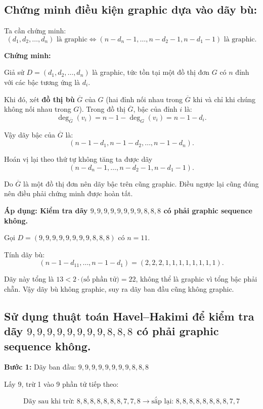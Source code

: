 \documentclass{article}
\begin{document}
	\subsection*{Chứng minh điều kiện graphic dựa vào dãy bù:}
	
	Ta cần chứng minh:
	\[
	(d_1, d_2, \ldots, d_n) \text{ là graphic} \iff (n - d_n - 1, \ldots, n - d_2 - 1, n - d_1 - 1) \text{ là graphic}.
	\]
	
	\textbf{Chứng minh:}
	
	Giả sử $D = (d_1, d_2, \ldots, d_n)$ là graphic, tức tồn tại một đồ thị đơn $G$ có $n$ đỉnh với các bậc tương ứng là $d_i$.
	
	Khi đó, xét \textbf{đồ thị bù} $\overline{G}$ của $G$ (hai đỉnh nối nhau trong $\overline{G}$ khi và chỉ khi chúng không nối nhau trong $G$). Trong đồ thị $\overline{G}$, bậc của đỉnh $i$ là:
	\[
	\deg_{\overline{G}}(v_i) = n - 1 - \deg_G(v_i) = n - 1 - d_i.
	\]
	
	Vậy dãy bậc của $\overline{G}$ là:
	\[
	(n - 1 - d_1, n - 1 - d_2, \ldots, n - 1 - d_n).
	\]
	
	Hoán vị lại theo thứ tự không tăng ta được dãy
	\[
	(n - d_n - 1, \ldots, n - d_2 - 1, n - d_1 - 1).
	\]
	
	Do $\overline{G}$ là một đồ thị đơn nên dãy bậc trên cũng graphic. Điều ngược lại cũng đúng nên điều phải chứng minh được hoàn tất. 
	
	\vspace{0.5em}
	\textbf{Áp dụng: Kiểm tra dãy $9,9,9,9,9,9,9,9,8,8,8$ có phải graphic sequence không.}
	
	Gọi $D = (9,9,9,9,9,9,9,9,8,8,8)$ có $n = 11$.
	
	Tính dãy bù:
	\[
	(n - 1 - d_{11}, \ldots, n - 1 - d_1) = (2,2,2,1,1,1,1,1,1,1,1).
	\]
	
	Dãy này tổng là $13 < 2\cdot \text{(số phần tử)} = 22$, không thể là graphic vì tổng bậc phải chẵn. Vậy dãy bù không graphic, suy ra dãy ban đầu cũng không graphic.
	
	\subsection*{Sử dụng thuật toán Havel--Hakimi để kiểm tra dãy $9,9,9,9,9,9,9,9,8,8,8$ có phải graphic sequence không.}
	
	\textbf{Bước 1:} Dãy ban đầu: $9,9,9,9,9,9,9,9,8,8,8$
	
	Lấy $9$, trừ 1 vào 9 phần tử tiếp theo:
	
	\[
	\text{Dãy sau khi trừ: } 8,8,8,8,8,8,8,7,7,8 \to \text{sắp lại: } 8,8,8,8,8,8,8,8,7,7
	\]
	
\end{document}
